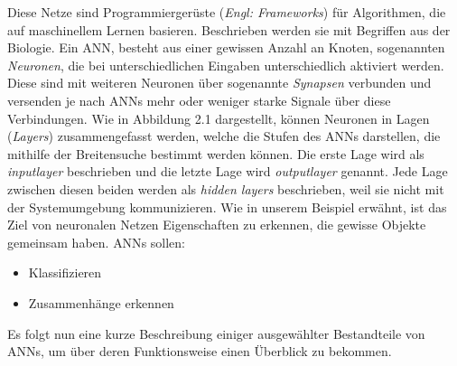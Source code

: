 \documentclass{thesisclass}
\begin{document}
Diese Netze sind Programmiergerüste (\textit{Engl: Frameworks}) für Algorithmen, die auf maschinellem Lernen basieren. Beschrieben werden sie mit Begriffen aus der Biologie. Ein  \gls{ANN}, besteht aus einer gewissen Anzahl an Knoten, sogenannten \textit{Neuronen}, die bei unterschiedlichen Eingaben unterschiedlich aktiviert werden. Diese sind mit weiteren Neuronen über sogenannte \textit{Synapsen} verbunden und versenden je nach \gls{ANN}s mehr oder weniger starke Signale über diese Verbindungen.
Wie in Abbildung 2.1 dargestellt, können Neuronen in Lagen (\textit{Layers}) zusammengefasst werden, welche die Stufen des \gls{ANN}s darstellen, die mithilfe der Breitensuche bestimmt werden können.
Die erste Lage wird als \textit{inputlayer} beschrieben und die letzte Lage wird \textit{outputlayer} genannt. Jede Lage zwischen diesen beiden werden als \textit{hidden layers} beschrieben, weil sie nicht mit der Systemumgebung kommunizieren.\newline
Wie in unserem Beispiel erwähnt, ist das Ziel von neuronalen Netzen Eigenschaften zu erkennen, die gewisse Objekte gemeinsam haben. \gls{ANN}s sollen:
\begin{itemize}
	\item Klassifizieren
	\item Zusammenhänge erkennen
\end{itemize}

Es folgt nun eine kurze Beschreibung einiger ausgewählter Bestandteile von \gls{ANN}s, um über deren Funktionsweise einen Überblick zu bekommen.
\end{document}
